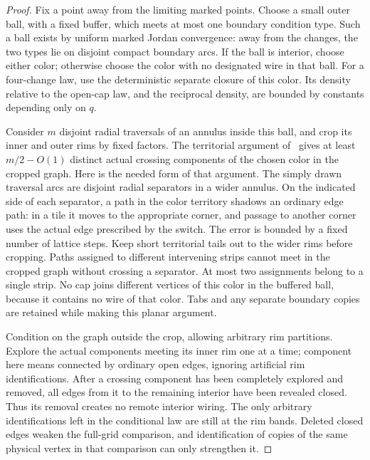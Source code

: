 \begin{proof}
Fix a point away from the limiting marked points.  Choose a small
outer ball, with a fixed buffer, which meets at most one boundary
condition type.  Such a ball exists by uniform marked Jordan
convergence: away from the changes, the two types lie on disjoint
compact boundary arcs.  If the ball is interior, choose either color;
otherwise choose the color with no designated wire in that ball.
For a four-change law, use the deterministic separate closure of
this color.  Its density relative to the open-cap law, and the
reciprocal density, are bounded by constants depending only on $q$.

Consider $m$ disjoint radial traversals of an annulus inside this
ball, and crop its inner and outer rims by fixed factors.  The
territorial argument of~\cite[Section ``Identification of the
Dobrushin strand'', Lemma ``Territorial arm counting'']{C} gives at
least $m/2-O(1)$ distinct actual crossing components of the chosen
color in the cropped graph.  Here is the needed form of that argument.
The simply drawn traversal arcs are disjoint radial separators in a
wider annulus.  On the indicated side of each separator, a path in
the color territory shadows an ordinary edge path: in a tile it
moves to the appropriate corner, and passage to another corner uses
the actual edge prescribed by the switch.  The error is bounded by
a fixed number of lattice steps.  Keep short territorial tails out
to the wider rims before cropping.  Paths assigned to different
intervening strips cannot meet in the cropped graph without crossing
a separator.  At most two assignments belong to a single strip.
No cap joins different vertices of this color in the buffered ball,
because it contains no wire of that color.  Tabs and any separate
boundary copies are retained while making this planar argument.

Condition on the graph outside the crop, allowing arbitrary rim
partitions.  Explore the actual components meeting its inner rim
one at a time; component here means connected by ordinary open
edges, ignoring artificial rim identifications.  After a crossing
component has been completely explored and removed, all edges from
it to the remaining interior have been revealed closed.  Thus its
removal creates no remote interior wiring.  The only arbitrary
identifications left in the conditional law are still at the rim
bands.  Deleted closed edges weaken the full-grid comparison, and
identification of copies of the same physical vertex in that
comparison can only strengthen it.


\end{proof}
